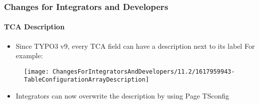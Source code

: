 %

\begin{frame}[fragile]
	\frametitle{Changes for Integrators and Developers}
	\framesubtitle{TCA Description}

	\begin{itemize}
		\item Since TYPO3 v9, every TCA field can have a description next to
			its label\newline
			For example:
	\end{itemize}
	\begin{figure}
		\texttt{[image: ChangesForIntegratorsAndDevelopers/11.2/1617959943-TableConfigurationArrayDescription]}
	\end{figure}
	\vspace{-0.4cm}
	\begin{itemize}
		\item Integrators can now overwrite the description by using Page TSconfig
	\end{itemize}
\end{frame}


